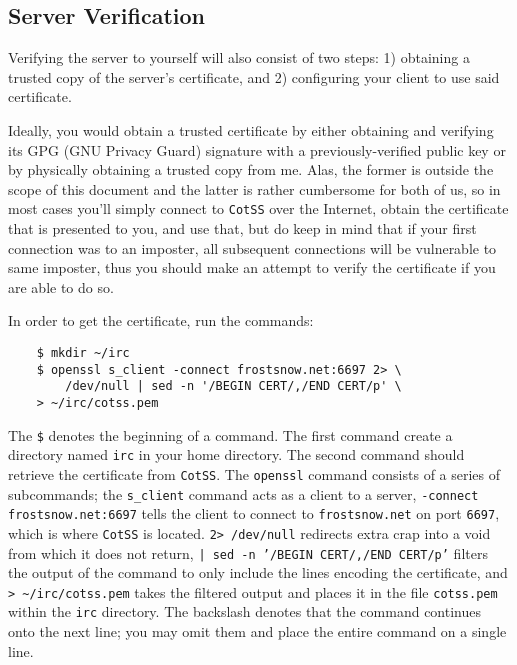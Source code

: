 \documentclass{article}
\begin{document}
\subsection{Server Verification}
Verifying the server to yourself will also consist of two steps: 1) obtaining a trusted copy of the server's certificate, and 2) configuring your client to use said certificate.

Ideally, you would obtain a trusted certificate by either obtaining and verifying its GPG (GNU Privacy Guard) signature with a previously-verified public key or by physically obtaining a trusted copy from me.  Alas, the former is outside the scope of this document and the latter is rather cumbersome for both of us, so in most cases you'll simply connect to \texttt{CotSS} over the Internet, obtain the certificate that is presented to you, and use that, but do keep in mind that if your first connection was to an imposter, all subsequent connections will be vulnerable to same imposter, thus you should make an attempt to verify the certificate if you are able to do so.

In order to get the certificate, run the commands:
\begin{lstlisting}
    $ mkdir ~/irc
    $ openssl s_client -connect frostsnow.net:6697 2> \
        /dev/null | sed -n '/BEGIN CERT/,/END CERT/p' \
	> ~/irc/cotss.pem
\end{lstlisting}
The \texttt{\$} denotes the beginning of a command.  The first command create a directory named \texttt{irc} in your home directory.  The second command should retrieve the certificate from \texttt{CotSS}.  The \texttt{openssl} command consists of a series of subcommands; the \texttt{s\_client} command acts as a client to a server, \texttt{-connect frostsnow.net:6697} tells the client to connect to \texttt{frostsnow.net} on port \texttt{6697}, which is where \texttt{CotSS} is located.  \texttt{2> /dev/null} redirects extra crap into a void from which it does not return, \texttt{| sed -n '/BEGIN CERT/,/END CERT/p'} filters the output of the command to only include the lines encoding the certificate, and \texttt{> \textasciitilde/irc/cotss.pem} takes the filtered output and places it in the file \texttt{cotss.pem} within the \texttt{irc} directory.  The backslash denotes that the command continues onto the next line; you may omit them and place the entire command on a single line.
\end{document}
